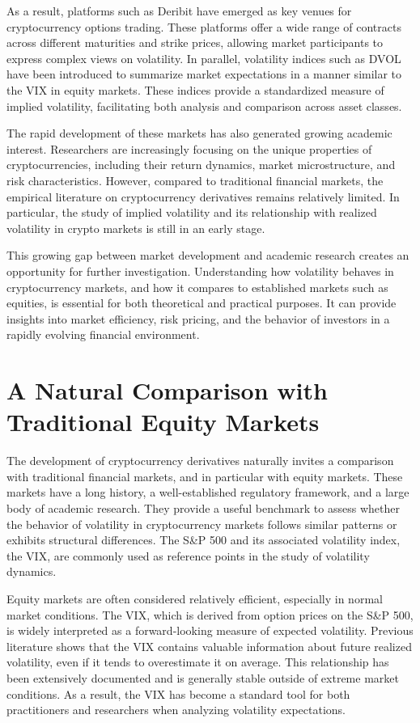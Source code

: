 \documentclass[11pt,a4paper,openany]{report}
\begin{document}
As a result, platforms such as Deribit have emerged as key venues for
cryptocurrency options trading. These platforms offer a wide range of
contracts across different maturities and strike prices, allowing market
participants to express complex views on volatility. In parallel,
volatility indices such as DVOL have been introduced to summarize market
expectations in a manner similar to the VIX in equity markets. These
indices provide a standardized measure of implied volatility,
facilitating both analysis and comparison across asset classes.

The rapid development of these markets has also generated growing
academic interest. Researchers are increasingly focusing on the unique
properties of cryptocurrencies, including their return dynamics, market
microstructure, and risk characteristics. However, compared to
traditional financial markets, the empirical literature on
cryptocurrency derivatives remains relatively limited. In particular,
the study of implied volatility and its relationship with realized
volatility in crypto markets is still in an early stage.

This growing gap between market development and academic research
creates an opportunity for further investigation. Understanding how
volatility behaves in cryptocurrency markets, and how it compares to
established markets such as equities, is essential for both theoretical
and practical purposes. It can provide insights into market efficiency,
risk pricing, and the behavior of investors in a rapidly evolving
financial environment.

\section{A Natural Comparison with Traditional Equity
Markets}\label{a-natural-comparison-with-traditional-equity-markets}

The development of cryptocurrency derivatives naturally invites a
comparison with traditional financial markets, and in particular with
equity markets. These markets have a long history, a well-established
regulatory framework, and a large body of academic research. They
provide a useful benchmark to assess whether the behavior of volatility
in cryptocurrency markets follows similar patterns or exhibits
structural differences. The S\&P 500 and its associated volatility
index, the VIX, are commonly used as reference points in the study of
volatility dynamics.

Equity markets are often considered relatively efficient, especially in
normal market conditions. The VIX, which is derived from option prices
on the S\&P 500, is widely interpreted as a forward-looking measure of
expected volatility. Previous literature shows that the VIX contains
valuable information about future realized volatility, even if it tends
to overestimate it on average. This relationship has been extensively
documented and is generally stable outside of extreme market conditions.
As a result, the VIX has become a standard tool for both practitioners
and researchers when analyzing volatility expectations.
\end{document}
